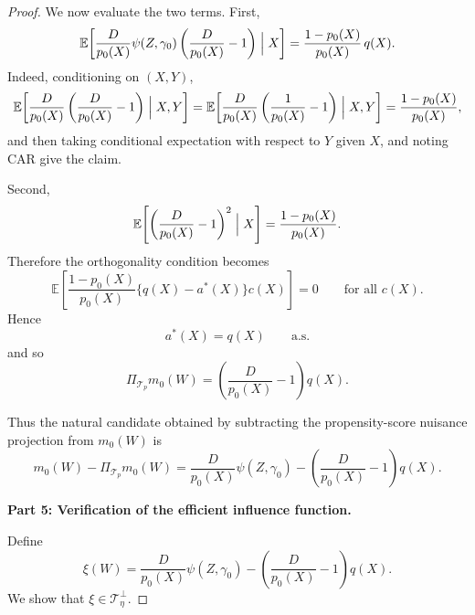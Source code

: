 \documentclass[12pt]{article}
\renewcommand{\(}{\left(}%
\renewcommand{\)}{\right)}%
\renewcommand{\[}{\left[}%
\renewcommand{\]}{\right]}%
\newtheorem{proof}{Proof.}}
\begin{document}
\begin{proof}
We now evaluate the two terms. First,
\begin{equation*}
\mathbb{E}\!\left[
\frac{D}{p_0(X)}\psi(Z,\gamma_0)
\left(\frac{D}{p_0(X)}-1\right)
\Bigm|X
\right]
=
\frac{1-p_0(X)}{p_0(X)}\,q(X).
\end{equation*}
Indeed, conditioning on $(X,Y)$,
\begin{equation*}
\mathbb{E}\!\left[
\frac{D}{p_0(X)}\left(\frac{D}{p_0(X)}-1\right)
\Bigm|X,Y
\right]
=\mathbb{E}\!\left[
\frac{D}{p_0(X)}\left(\frac{1}{p_0(X)}-1\right)
\Bigm|X,Y
\right]=
\frac{1-p_0(X)}{p_0(X)},
\end{equation*}
and then taking conditional expectation with respect to $Y$ given $X$, and noting CAR give the claim.

Second,
\begin{equation*}
\mathbb{E}\!\left[
\left(\frac{D}{p_0(X)}-1\right)^2
\Bigm|X
\right]
=
\frac{1-p_0(X)}{p_0(X)}.
\end{equation*}
Therefore the orthogonality condition becomes
\begin{equation*}
\mathbb{E}\!\left[
\frac{1-p_0(X)}{p_0(X)}
\{q(X)-a^*(X)\}
c(X)
\right]=0
\qquad
\text{for all } c(X).
\end{equation*}
Hence
\begin{equation*}
a^*(X)=q(X)
\qquad \text{a.s.}
\end{equation*}
and so
\begin{equation*}
\Pi_{\mathcal{T}_{p}} m_0(W)
=
\left(\frac{D}{p_0(X)}-1\right)q(X).
\end{equation*}

Thus the natural candidate obtained by subtracting the propensity-score nuisance projection from $m_0(W)$ is
\begin{equation*}
m_0(W)-\Pi_{\mathcal{T}_{p}}m_0(W)
=
\frac{D}{p_0(X)}\psi(Z,\gamma_0)
-
\left(\frac{D}{p_0(X)}-1\right)q(X).
\end{equation*}

\medskip
\noindent
\textbf{Part 5: Verification of the efficient influence function.}

Define
\begin{equation*}
\xi(W)
=
\frac{D}{p_0(X)}\psi(Z,\gamma_0)
-
\left(\frac{D}{p_0(X)}-1\right)q(X).
\end{equation*}
We show that $\xi\in \mathcal{T}_{\eta}^{\perp}$.


\end{proof}
\end{document}
